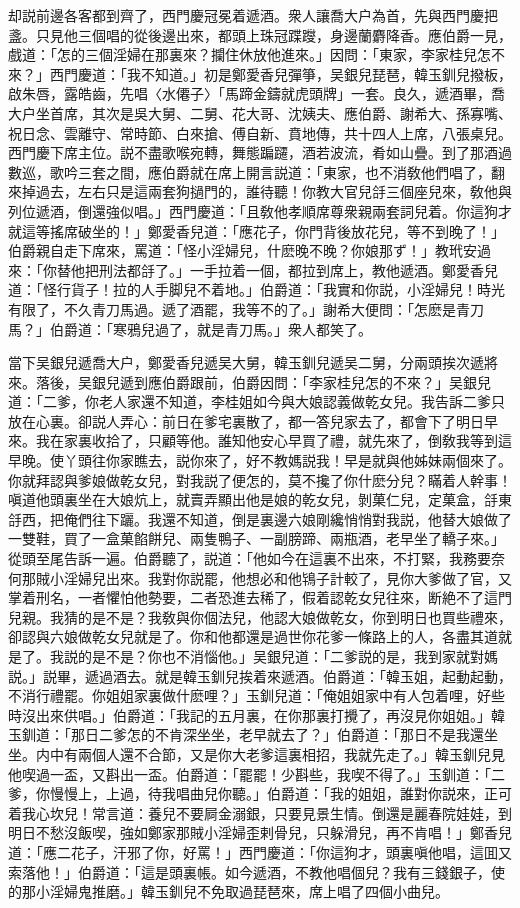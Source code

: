 却説前邊各客都到齊了，西門慶冠冕着遞酒。衆人讓喬大户為首，先與西門慶把盞。只見他三個唱的從後邊出來，都頭上珠冠蹀躞，身邊蘭麝降香。應伯爵一見，戲道：「怎的三個淫婦在那裏來？攔住休放他進來。」因問：「東家，李家桂兒怎不來？」西門慶道：「我不知道。」初是鄭愛香兒彈箏，吴銀兒琵琶，韓玉釧兒撥板，啟朱唇，露皓齒，先唱〈水僊子〉「馬蹄金鑄就虎頭牌」一套。良久，遞酒畢，喬大户坐首席，其次是吳大舅、二舅、花大哥、沈姨夫、應伯爵、謝希大、孫寡嘴、祝日念、雲離守、常時節、白來搶、傅自新、賁地傳，共十四人上席，八張桌兒。西門慶下席主位。説不盡歌喉宛轉，舞態蹁躚，酒若波流，肴如山疊。到了那酒過數巡，歌吟三套之間，應伯爵就在席上開言説道：「東家，也不消敎他們唱了，翻來掉過去，左右只是這兩套狗撾門的，誰待聽！你教大官兒㧱三個座兒來，敎他與列位遞酒，倒還強似唱。」西門慶道：「且敎他孝順席尊衆親兩套詞兒着。你這狗才就這等搖席破坐的！」鄭愛香兒道：「應花子，你門背後放花兒，等不到晚了！」伯爵親自走下席來，罵道：「怪小淫婦兒，什麽晚不晚？你娘那ず！」教玳安過來：「你替他把刑法都㧱了。」一手拉着一個，都拉到席上，教他遞酒。鄭愛香兒道：「怪行貨子！拉的人手脚兒不着地。」伯爵道：「我實和你説，小淫婦兒！時光有限了，不久青刀馬過。遞了酒罷，我等不的了。」謝希大便問：「怎麽是青刀馬？」伯爵道：「寒鴉兒過了，就是青刀馬。」衆人都笑了。

當下吴銀兒遞喬大户，鄭愛香兒遞吴大舅，韓玉釧兒遞吴二舅，分兩頭挨次遞將來。落後，吴銀兒遞到應伯爵跟前，伯爵因問：「李家桂兒怎的不來？」吴銀兒道：「二爹，你老人家還不知道，李桂姐如今與大娘認義做乾女兒。我告訴二爹只放在心裏。卻説人弄心：前日在爹宅裏散了，都一答兒家去了，都會下了明日早來。我在家裏收拾了，只顧等他。誰知他安心早買了禮，就先來了，倒敎我等到這早晚。使丫頭往你家瞧去，説你來了，好不教媽説我！早是就與他姊妹兩個來了。你就拜認與爹娘做乾女兒，對我説了便怎的，莫不攙了你什麽分兒？瞞着人幹事！嗔道他頭裏坐在大娘炕上，就賣弄顯出他是娘的乾女兒，剝菓仁兒，定菓盒，㧱東㧱西，把俺們往下躧。我還不知道，倒是裏邊六娘剛纔悄悄對我説，他替大娘做了一雙鞋，買了一盒菓餡餅兒、兩隻鴨子、一副膀蹄、兩瓶酒，老早坐了轎子來。」從頭至尾告訴一遍。伯爵聽了，説道：「他如今在這裏不出來，不打緊，我務要奈何那賊小淫婦兒出來。我對你説罷，他想必和他鴇子計較了，見你大爹做了官，又掌着刑名，一者懼怕他勢要，二者恐進去稀了，假着認乾女兒往來，断絶不了這門兒親。我猜的是不是？我敎與你個法兒，他認大娘做乾女，你到明日也買些禮來，卻認與六娘做乾女兒就是了。你和他都還是過世你花爹一條路上的人，各盡其道就是了。我説的是不是？你也不消惱他。」吴銀兒道：「二爹説的是，我到家就對媽説。」説畢，遞過酒去。就是韓玉釧兒挨着來遞酒。伯爵道：「韓玉姐，起動起動，不消行禮罷。你姐姐家裏做什麽哩？」玉釧兒道：「俺姐姐家中有人包着哩，好些時沒出來供唱。」伯爵道：「我記的五月裏，在你那裏打攪了，再沒見你姐姐。」韓玉釧道：「那日二爹怎的不肯深坐坐，老早就去了？」伯爵道：「那日不是我還坐坐。内中有兩個人還不合節，又是你大老爹這裏相招，我就先走了。」韓玉釧兒見他喫過一盃，又斟出一盃。伯爵道：「罷罷！少斟些，我喫不得了。」玉釧道：「二爹，你慢慢上，上過，待我唱曲兒你聽。」伯爵道：「我的姐姐，誰對你説來，正可着我心坎兒！常言道：養兒不要屙金溺銀，只要見景生情。倒還是麗春院娃娃，到明日不愁沒飯喫，強如鄭家那賊小淫婦歪剌骨兒，只躲滑兒，再不肯唱！」鄭香兒道：「應二花子，汗邪了你，好罵！」西門慶道：「你這狗才，頭裏嗔他唱，這囬又索落他！」伯爵道：「這是頭裏帳。如今遞酒，不教他唱個兒？我有三錢銀子，使的那小淫婦鬼推磨。」韓玉釧兒不免取過琵琶來，席上唱了四個小曲兒。

